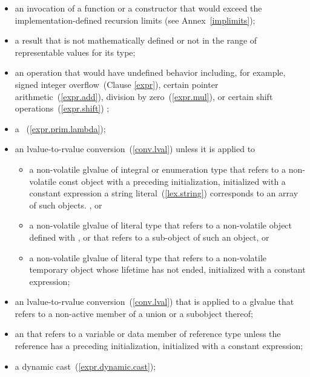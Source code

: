 \begin{itemize}
\item
an invocation of a  function or a 
constructor that would exceed the implementation-defined recursion limits
(see Annex~\ref{implimits});

\item
a result that is not mathematically defined or not in the range of representable
values for its type;

\item
an operation that would have undefined behavior \enternote including,
for example, signed integer overflow~(Clause \ref{expr}), certain
pointer arithmetic~(\ref{expr.add}), division by
zero~(\ref{expr.mul}), or certain shift operations~(\ref{expr.shift})
\exitnote;

\item
a ~(\ref{expr.prim.lambda});

\item
an lvalue-to-rvalue conversion~(\ref{conv.lval}) unless
it is applied to

\begin{itemize}
\item
a non-volatile glvalue of integral or enumeration type that refers to a non-volatile const
object with a preceding initialization, initialized with a constant
expression \enternote a string literal~(\ref{lex.string}) corresponds
to an array of such objects.
\exitnote, or

\item
a non-volatile glvalue of literal type that refers to a non-volatile object
defined with , or that refers to a sub-object
of such an object, or

\item
a non-volatile glvalue of literal type that refers to a non-volatile temporary object
whose lifetime has not ended,
initialized with
a constant expression;
\end{itemize}

\item
an lvalue-to-rvalue conversion~(\ref{conv.lval}) that is applied to a glvalue
that refers to a non-active member of a union or a subobject thereof;

\item
an  that refers to a variable or
data member of reference type
unless the reference has a preceding initialization, initialized with a constant
expression;

\item
a dynamic cast~(\ref{expr.dynamic.cast});


\end{itemize}
